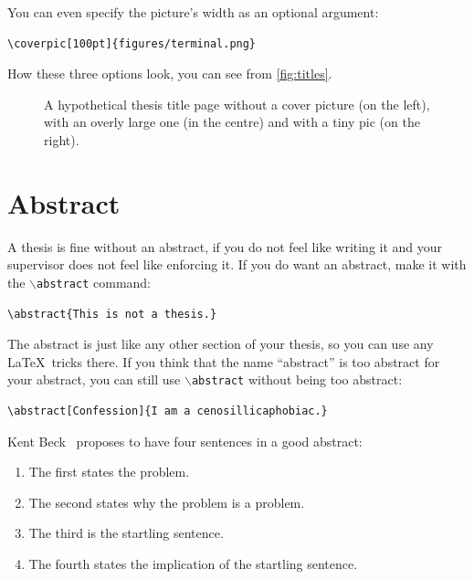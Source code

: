 \documentclass{uvamscse}
\newcommand{\cmd}[1]{\texttt{$\backslash$#1}}
\begin{document}
You can even specify the picture's width as an optional argument:

\begin{snippet}
\begin{verbatim}
\coverpic[100pt]{figures/terminal.png}
\end{verbatim}
\end{snippet}

How these three options look, you can see from \autoref{fig:titles}.

\begin{figure}[t]
  \hfill
  \hfill
  \caption{A hypothetical thesis title page without a cover picture (on the left), with an overly large one (in the centre) and with a tiny pic (on the right).}
  \label{fig:titles}
\end{figure}

\section{Abstract}

A thesis is fine without an abstract, if you do not feel like writing it and
your supervisor does not feel like enforcing it. If you do want an abstract,
make it with the \cmd{abstract} command:

\begin{snippet}
\begin{verbatim}
\abstract{This is not a thesis.}
\end{verbatim}
\end{snippet}

The abstract is just like any other section of your thesis, so you can use any
\LaTeX\ tricks there. If you think that the name ``abstract'' is too abstract
for your abstract, you can still use \cmd{abstract} without being too
abstract:

\begin{snippet}
\begin{verbatim}
\abstract[Confession]{I am a cenosillicaphobiac.}
\end{verbatim}
\end{snippet}

Kent Beck~\cite{JohnsonBBCGW93} proposes to have four sentences in a good abstract:

\begin{enumerate}
  \item The first states the problem.
  \item The second states why the problem is a problem.
  \item The third is the startling sentence.
  \item The fourth states the implication of the startling sentence.
\end{enumerate}
\end{document}

